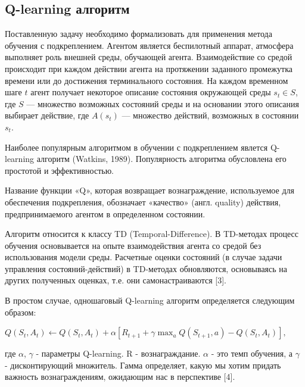 \documentclass[a4paper]{report}
\theoremstyle{definition}
\theoremstyle{plain}
\theoremstyle{remark}
\theoremstyle{remark}
\theoremstyle{definition}
\begin{document}
\newpage
\begin{center}
\section{Q-learning алгоритм}
\end{center}

Поставленную задачу необходимо формализовать для применения метода обучения с подкреплением. Агентом является беспилотный аппарат, атмосфера выполняет роль внешней среды, обучающей агента. Взаимодействие со средой происходит при каждом действии агента на протяжении заданного промежутка времени или до достижения терминального состояния. На каждом временном шаге $ t $ агент получает некоторое описание состояния окружающей среды $ s_{t} \in S$, где $ S $ — множество возможных состояний среды и на основании этого описания выбирает действие, где $ A(s_{t}) $ — множество действий, возможных в состоянии $s_{t}$.

Наиболее популярным алгоритмом в обучении с подкреплением явлется Q-learning алгоритм (Watkins, 1989). Популярность алгоритма обусловлена его простотой и эффективностью.

Название функции «Q», которая возвращает вознаграждение, используемое для обеспечения подкрепления, обозначает «качество» (англ. quality) действия, предпринимаемого агентом в определенном состоянии. 

Алгоритм относится к классу TD (Temporal-Difference). В TD-методах процесс обучения основывается на опыте взаимодействия агента со средой без использования модели среды. Расчетные оценки состояний (в случае задачи управления состояний-действий) в TD-методах обновляются, основываясь на других полученных оценках, т.е. они самонастраиваются [3].

В простом случае, одношаговый Q-learning алгоритм определяется следующим образом:
\begin{center}
    $
    Q(S_{t}, A_{t}) \leftarrow Q(S_{t}, A_{t}) + \alpha[R_{t+1} + \gamma \max_{a} Q(S_{t+1}, a) - Q(S_{t}, A_{t})],
    $
\end{center}
где $\alpha$, $\gamma$ - параметры Q-learning. R - вознаграждание. $\alpha$ - это темп обучения, а $\gamma$ - дисконтирующий множитель. Гамма определяет, какую мы хотим придать важность вознаграждениям, ожидающим нас в перспективе [4].
\end{document}
